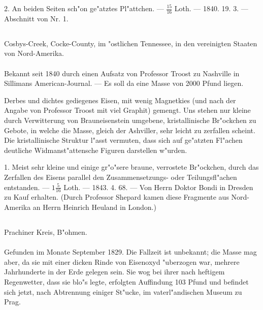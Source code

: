 \documentclass[a4paper, 11pt, oneside, polutonikogreek, german]{article}
\begin{document}
2. An beiden Seiten sch"on ge"atztes Pl"attchen. --- $\frac{15}{16}$ Loth. --- 1840. 19. 3. --- Abschnitt von Nr. 1.
\subsection{}
\begin{center}

Cosbys-Creek, Cocke-County, im "ostlichen Tennessee, in den vereinigten Staaten von Nord-Amerika.
\end{center}
\paragraph{}
Bekannt seit 1840 durch einen Aufsatz von Professor Troost zu Nashville in Sillimans American-Journal. --- Es soll da eine Masse von 2000 Pfund liegen.

Derbes und dichtes gediegenes Eisen, mit wenig Magnetkies (und nach der Angabe von Professor Troost mit viel Graphit) gemengt. Uns stehen nur kleine durch Verwitterung von Brauneisenstein umgebene, kristallinische Br"ockchen zu Gebote, in welche die Masse, gleich der Ashviller, sehr leicht zu zerfallen scheint. Die kristallinische Struktur l"asst vermuten, dass sich auf ge"atzten Fl"achen deutliche Widmanst"attensche Figuren darstellen w"urden.

1. Meist sehr kleine und einige gr"o"sere braune, verrostete Br"ockchen, durch das Zerfallen des Eisens parallel den Zusammensetzungs- oder Teilungsfl"achen entstanden. --- $1\frac{5}{16}$ Loth. --- 1843. 4. 68. --- Von Herrn Doktor Bondi in Dresden zu Kauf erhalten. (Durch Professor Shepard kamen diese Fragmente aus Nord-Amerika an Herrn Heinrich Heuland in London.)
\subsection{}
\begin{center}

Prachiner Kreis, B"ohmen.
\end{center}
\paragraph{}
Gefunden im Monate September 1829. Die Fallzeit ist unbekannt; die Masse mag aber, da sie mit einer dicken Rinde von Eisenoxyd "uberzogen war, mehrere Jahrhunderte in der Erde gelegen sein. Sie wog bei ihrer nach heftigem Regenwetter, dass sie blo"s legte, erfolgten Auffindung 103 Pfund und befindet sich jetzt, nach Abtrennung einiger St"ucke, im vaterl"andischen Museum zu Prag.
\end{document}
